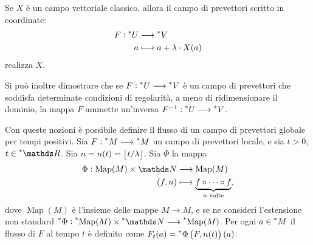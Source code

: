Se $ X $ è un campo vettoriale classico, allora il campo di prevettori scritto in coordinate: \begin{align*}
F:\prescript{*}{}{U} &\longrightarrow \prescript{*}{}{V} \\
a &\longmapsto a + \lambda \cdot X(a)
\end{align*}realizza $ X $.



Si può inoltre dimostrare che se $ F: \prescript{*}{}{U} \longrightarrow \prescript{*}{}{V} $ è un campo di prevettori che soddisfa determinate condizioni di regolarità, a meno di ridimensionare il dominio, la mappa $ F $ ammette un'inversa $ F^{-1}: \prescript{*}{}{U} \longrightarrow \prescript{*}{}{V} $.

Con queste nozioni è possibile definire il flusso di un campo di prevettori globale per tempi positivi. Sia $ F: \prescript{*}{}{M} \longrightarrow \prescript{*}{}{M}  $ un campo di prevettori locale, e sia $ t>0 $, $ t \in \starR $. Sia $ n = n(t) = \left\lfloor t/\lambda \right\rfloor $. Sia $ \Phi $ la mappa \begin{align*}
    \Phi:\operatorname{Map}(M) \times \N &\longrightarrow \operatorname{Map}(M) \\
    (f,n) &\longmapsto \underset{n\text{ volte}}{\underbrace{f\circ \dots\circ f}},
    \end{align*}dove $ \operatorname{Map}(M) $ è l'insieme delle mappe $ M \longrightarrow M$, e se ne consideri l'estensione non standard $ \nonstandard{\Phi}: \nonstandard{\operatorname{Map}(M)}\times \nonstandard{\N} \longrightarrow \nonstandard{\operatorname{Map}(M)} $. Per ogni $ a \in \prescript{*}{}{M} $ il flusso di $ F $ al tempo $ t $ è definito come $ F_{t}(a) = \prescript{*}{}{\Phi}\left(F,n(t)\right)(a) $. 

